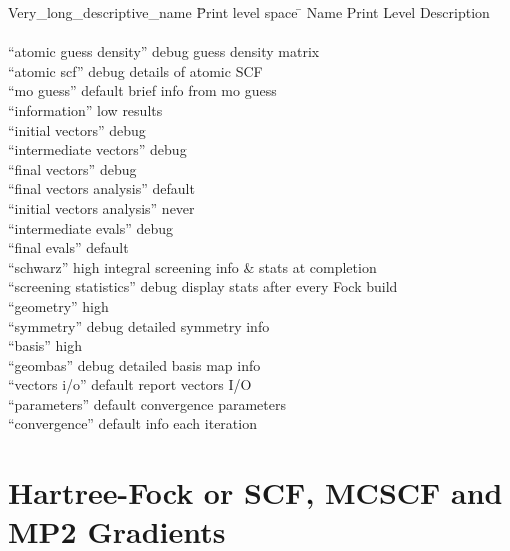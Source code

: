 \begin{tabbing}
  Very\_long\_descriptive\_name \= Print level space \= \kill
  Name                    \> Print Level \> Description \\
                          \>        \> \\
 ``atomic guess density'' \> debug  \> guess density matrix \\
 ``atomic scf''           \> debug  \> details of atomic SCF \\
 ``mo guess''             \> default\> brief info from mo guess \\
 ``information''          \> low    \> results  \\
 ``initial vectors''      \> debug  \> \\
 ``intermediate vectors'' \> debug  \> \\
 ``final vectors''        \> debug  \> \\
 ``final vectors analysis''        \> default  \> \\
 ``initial vectors analysis''        \> never  \> \\
 ``intermediate evals''   \> debug  \> \\
 ``final evals''          \> default\> \\
 ``schwarz''              \> high   \> integral screening info \&
  stats at completion\\
 ``screening statistics'' \> debug  \> display stats after every Fock build \\
 ``geometry''             \> high   \> \\
 ``symmetry''             \> debug  \> detailed symmetry info \\
 ``basis''                \> high   \> \\
 ``geombas''              \> debug  \> detailed basis map info \\
 ``vectors i/o''          \> default\> report vectors I/O \\
 ``parameters''           \> default\> convergence parameters \\
 ``convergence''          \> default\> info each iteration
\end{tabbing}

\section{Hartree-Fock or SCF, MCSCF and MP2 Gradients}



